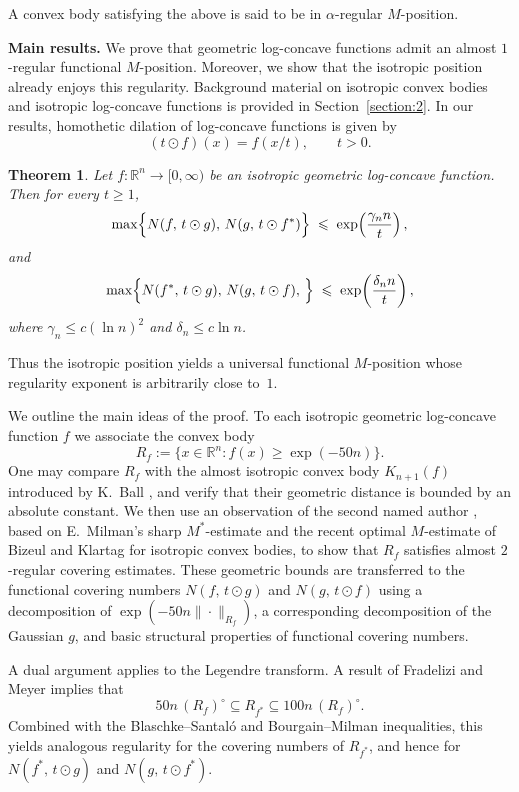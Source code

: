 \documentclass[11pt,leqno]{article}
\newtheorem{theorem}{Theorem}[section]
\theoremstyle{definition}
\theoremstyle{remark}
\numberwithin{equation}{section}
\newcommand{\ls}{\leqslant}
\newcommand{\gr}{\geqslant}
\begin{document}
A convex body satisfying the above is said to be in $\alpha$-regular $M$-position.

\medskip

\textbf{Main results.} We prove that geometric log-concave functions admit an almost $1$-regular functional $M$-position.  
Moreover, we show that the isotropic position already enjoys this regularity. Background material on isotropic convex bodies 
and isotropic log-concave functions is provided in Section~\ref{section:2}. In our results, homothetic dilation of 
log-concave functions is given by
$$(t\odot f)(x)=f(x/t), \qquad t>0.$$

\begin{theorem}\label{th:regular-M-covering}
Let $f:\mathbb{R}^{n}\to[0,\infty)$ be an isotropic geometric log-concave function.
Then for every $t\gr 1$,
$$\max\Bigl\{N(f,\, t\odot g),\, N(g,\, t\odot f^{\ast})\Bigr\}
\;\ls\;\exp\!\left( \frac{\gamma_{n} n}{t} \right),$$
and 
$$\max\Bigl\{N(f^{\ast},\, t\odot g),\, N(g,\, t\odot f),\,\Bigr\}
\;\ls\;\exp\!\left( \frac{\delta_{n} n}{t} \right),$$
where $\gamma_{n} \ls c(\ln n)^{2}$ and $\delta_n\ls c\ln n$.
\end{theorem}

Thus the isotropic position yields a universal functional $M$-position whose
regularity exponent is arbitrarily close to~$1$.

\smallskip

We outline the main ideas of the proof.   
To each isotropic geometric log-concave function $f$ we associate the convex body
$$R_f:=\{x\in\mathbb{R}^n:f(x)\gr\exp(-50n)\}.$$
One may compare $R_f$ with the almost isotropic convex body $K_{n+1}(f)$ introduced by K.~Ball \cite{Ball-1988}, 
and verify that their geometric distance is bounded by an absolute constant.  
We then use an observation of the second named author \cite{Tziotziou-2025}, based on 
E.~Milman's sharp $M^{\ast}$-estimate \cite{EMilman-2014} and the recent optimal $M$-estimate of 
Bizeul and Klartag \cite{Bizeul-Klartag-2025} for isotropic convex bodies, to show that $R_f$ satisfies almost $2$-regular 
covering estimates.  
These geometric bounds are transferred to the functional covering numbers 
$N(f,\, t\odot g)$ and $N(g,\, t\odot f)$ using a decomposition of 
$\exp(-50n\|\cdot\|_{R_f})$, a corresponding decomposition of the Gaussian $g$, 
and basic structural properties of functional covering numbers.

A dual argument applies to the Legendre transform.  
A result of Fradelizi and Meyer \cite{Fradelizi-Meyer-2008} implies that
$$50n\,(R_f)^{\circ}\subseteq R_{f^{\ast}}\subseteq 100n\, (R_f)^{\circ}.$$
Combined with the Blaschke--Santal\'o and Bourgain--Milman inequalities, 
this yields analogous regularity for the covering numbers of $R_{f^{\ast}}$, and hence 
for $N(f^{\ast},\, t\odot g)$ and $N(g,\, t\odot f^{\ast})$.
\end{document}
